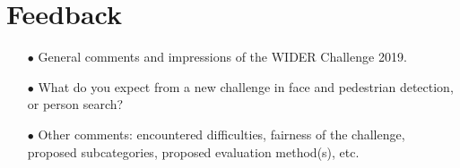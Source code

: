 \documentclass[runningheads]{llncs}
\begin{document}
\section{Feedback}
\begin{spacing}{1.5}
\begin{itemize}

\item[$\bullet$] General comments and impressions of the WIDER Challenge 2019.

\item[$\bullet$] What do you expect from a new challenge in face and pedestrian detection, or person search?

\item[$\bullet$] Other comments: encountered difficulties, fairness of the challenge, proposed subcategories, proposed evaluation method(s), etc.

\end{itemize}
\end{spacing}




\end{document}
